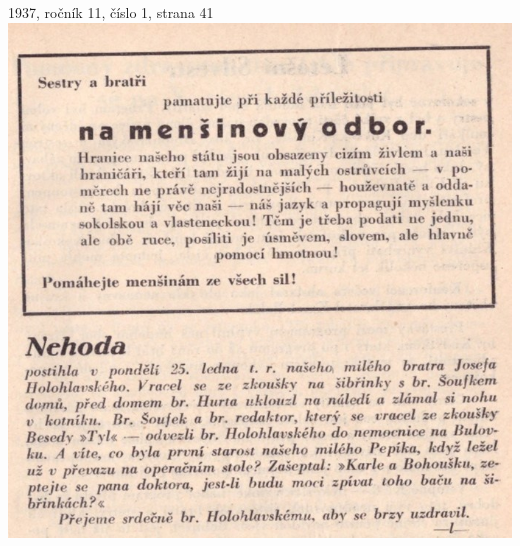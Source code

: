 \documentclass[11pt]{article}
\begin{document}
1937, ročník 11, číslo 1, strana 41 \\
\includegraphics[width=\imagewidth]{original/1937/Skener_20250325.jpg}
\end{document}
